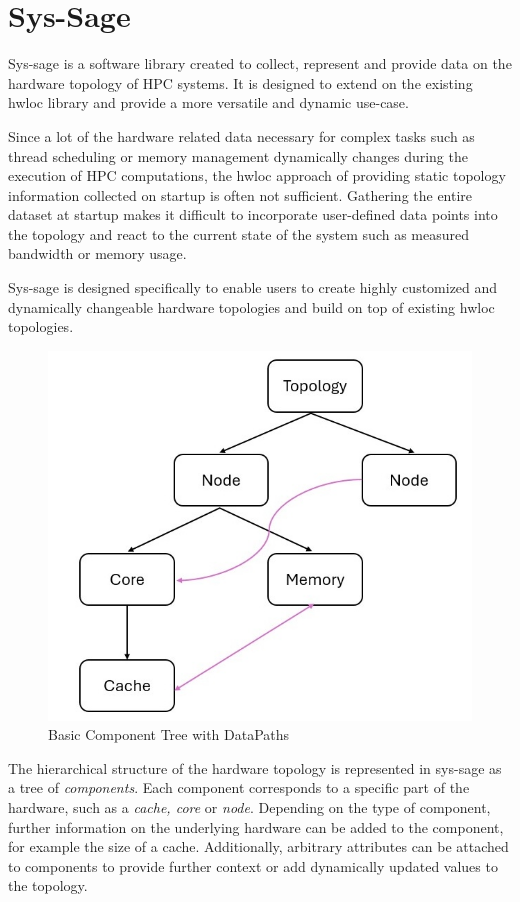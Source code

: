\chapter{Sys-Sage}\label{chapter:sys_sage}
Sys-sage is a software library created to collect, represent and provide data on the hardware topology of HPC systems.
It is designed to extend on the existing hwloc library and provide a more versatile and dynamic use-case.

Since a lot of the hardware related data necessary for complex tasks such as thread scheduling or memory management dynamically changes during the execution of
HPC computations, the hwloc approach of providing static topology information collected on startup is often not sufficient.
Gathering the entire dataset at startup makes it difficult to incorporate user-defined data points into the topology and react to the current state of the system
such as measured bandwidth or memory usage.

Sys-sage is designed specifically to enable users to create highly customized and dynamically changeable hardware topologies and build on top of existing hwloc topologies.

\begin{figure}[ht]
    \includegraphics[scale=0.5]{images/Topology_Example.jpg}
    \centering
    \caption{Basic Component Tree with DataPaths}
    \label{figure:topology_example}
\end{figure}

The hierarchical structure of the hardware topology is represented in sys-sage as a tree of \emph{components}.
Each component corresponds to a specific part of the hardware, such as a \emph{cache, core} or \emph{node}.
Depending on the type of component, further information on the underlying hardware can be added to the component, for example the size of a cache.
Additionally, arbitrary attributes can be attached to components to provide further context or add dynamically updated values to the topology. \cite{sys_concept}

